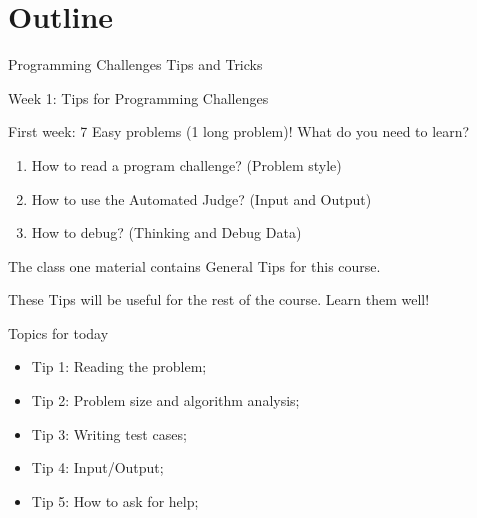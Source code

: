 

\section{Outline}

\begin{frame}
  \centering
  {\huge
    Programming Challenges Tips and Tricks
  }
\end{frame}

\begin{frame}[t]{Week 1: Tips for Programming Challenges}

  First week: 7 Easy problems (1 long problem)! What do you need to learn?
  \bigskip

  \begin{enumerate}
    \item How to read a program challenge? (Problem style)
    \item How to use the Automated Judge? (Input and Output)
    \item How to debug? (Thinking and Debug Data)
  \end{enumerate}
  \bigskip

  The class one material contains \alert{General Tips} for this course.
  \medskip

  These Tips will be useful for the rest of the course. Learn them well!
\end{frame}

\begin{frame}{Topics for today}
  \begin{itemize}
    \item Tip 1: Reading the problem;
    \item Tip 2: Problem size and algorithm analysis;
    \item Tip 3: Writing test cases;
    \item Tip 4: Input/Output;
    \item Tip 5: How to ask for help;
  \end{itemize}
\end{frame}

